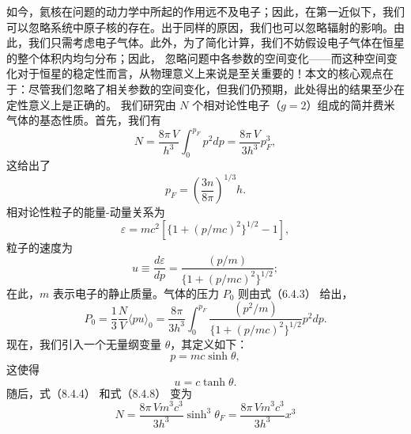 如今，氦核在问题的动力学中所起的作用远不及电子；因此，在第一近似下，我们可以忽略系统中原子核的存在。出于同样的原因，我们也可以忽略辐射的影响。由此，我们只需考虑电子气体。此外，为了简化计算，我们不妨假设电子气体在恒星的整个体积内均匀分布；因此，
忽略问题中各参数的空间变化——而这种空间变化对于恒星的稳定性而言，从物理意义上来说是至关重要的！本文的核心观点在于：尽管我们忽略了相关参数的空间变化，但我们仍预期，此处得出的结果至少在定性意义上是正确的。
我们研究由 \(N\) 个相对论性电子（\(g=2\)）组成的简并费米气体的基态性质。首先，我们有
\begin{equation}\tag{8.3.32}\label{eq:8.3.32}
N = \frac { 8 \pi \, V } { h ^{3} } \int _ { 0 } ^{p _ { F} } p ^{2} d p = \frac { 8 \pi \, V } { 3 h ^{3} } p _ { F } ^{3} ,
\end{equation}
这给出了
\begin{equation}\tag{8.3.33}\label{eq:8.3.33}
p _ { F } = \left( { \frac { 3 n } { 8 \pi } } \right) ^{1 / 3} h .
\end{equation}
相对论性粒子的能量-动量关系为
\begin{equation}\tag{8.3.34}\label{eq:8.3.34}
\varepsilon = m c ^{2} [ \{ 1 + ( p / m c ) ^{2} \} ^{1 / 2} - 1 ] ,
\end{equation}
粒子的速度为
\begin{equation}\tag{8.3.35}\label{eq:8.3.35}
u \equiv \frac { d \varepsilon } { d p } = \frac { ( p / m ) } { \{ 1 + ( p / m c ) ^{2} \} ^{1 / 2} } ;
\end{equation}
在此，\(m\) 表示电子的静止质量。气体的压力 \(P_{0}\) 则由式（6.4.3） 给出，
\begin{equation}\tag{8.3.36}\label{eq:8.3.36}
P _ { 0 } = \frac { 1 } { 3 } \frac { N } { V } \langle p u \rangle _ { 0 } = \frac { 8 \pi } { 3 h ^{3} } \int _ { 0 } ^{p _ { F} } \frac { ( p ^{2} / m ) } { \{ 1 + ( p / m c ) ^{2} \} ^{1 / 2} } p ^{2} d p .
\end{equation}
现在，我们引入一个无量纲变量 \(\theta\)，其定义如下：
\begin{equation}\tag{8.3.37}\label{eq:8.3.37}
p = m c \sinh \theta ,
\end{equation}
这使得
\begin{equation}\tag{8.3.38}\label{eq:8.3.38}
u = c \operatorname { t a n h } \theta .
\end{equation}
随后，式（8.4.4） 和式（8.4.8） 变为
\begin{equation}\tag{8.3.39}\label{eq:8.3.39}
N = \frac { 8 \pi \, V m ^{3} c ^{3} } { 3 h ^{3} } \sinh ^{3} \theta _ { F } = \frac { 8 \pi \, V m ^{3} c ^{3} } { 3 h ^{3} } x ^{3}
\end{equation}
